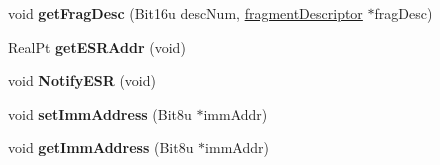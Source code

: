 \begin{DoxyCompactItemize}
\item 
\hypertarget{classECBClass_aff055b6bdb6038acccec8a249811e30b}{void {\bfseries get\-Frag\-Desc} (Bit16u desc\-Num, \hyperlink{structfragmentDescriptor}{fragment\-Descriptor} $\ast$frag\-Desc)}\label{classECBClass_aff055b6bdb6038acccec8a249811e30b}

\item 
\hypertarget{classECBClass_a92f4b8f3a62fa68bc7b305be59b6f53a}{Real\-Pt {\bfseries get\-E\-S\-R\-Addr} (void)}\label{classECBClass_a92f4b8f3a62fa68bc7b305be59b6f53a}

\item 
\hypertarget{classECBClass_ab5e8c7b7a81c49105b720140e569e00a}{void {\bfseries Notify\-E\-S\-R} (void)}\label{classECBClass_ab5e8c7b7a81c49105b720140e569e00a}

\item 
\hypertarget{classECBClass_afd976490a75b50898f011a4ffc0e4d06}{void {\bfseries set\-Imm\-Address} (Bit8u $\ast$imm\-Addr)}\label{classECBClass_afd976490a75b50898f011a4ffc0e4d06}

\item 
\hypertarget{classECBClass_a025bcbf405fb2f13a1caba265f95bc17}{void {\bfseries get\-Imm\-Address} (Bit8u $\ast$imm\-Addr)}\label{classECBClass_a025bcbf405fb2f13a1caba265f95bc17}

\end{DoxyCompactItemize}
